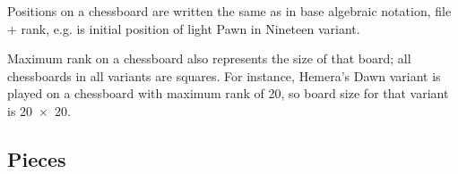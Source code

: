 Positions on a chessboard are written the same as in base algebraic notation, file + rank,
e.g.  is initial position of light Pawn in Nineteen variant.

Maximum rank on a chessboard also represents the size of that board; all chessboards in all
variants are squares. For instance, Hemera's Dawn variant is played on a chessboard with
maximum rank of 20, so board size for that variant is \mbox{20 $\times$ 20}.

\clearpage %

\subsection*{Pieces}
\label{sec:Appendix/Introduction/Pieces}


